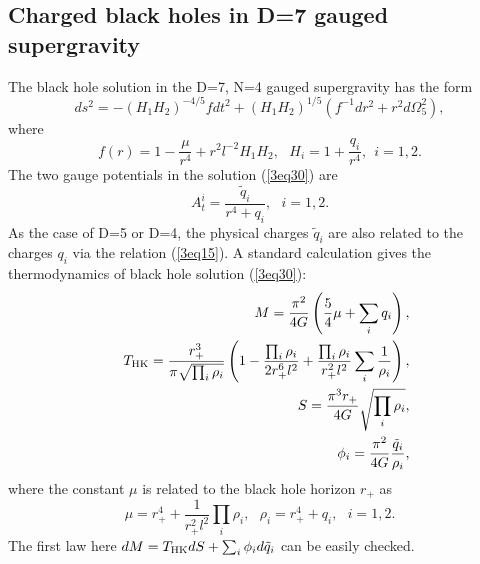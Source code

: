 \documentclass[a4paper,12pt]{article}
\begin{document}
\subsection{Charged black holes in D=7 gauged supergravity}

The black hole solution in the D=7, N=4 gauged supergravity has the
form \cite{Liu,Cvetic}
\begin{equation}
\label{3eq30}
ds^2 = -(H_1H_2)^{-4/5} fdt^2 +(H_1H_2)^{1/5}(f^{-1}dr^2 +r^2d\Omega_5^2),
\end{equation}
where
\begin{equation}
f(r)= 1-\frac{\mu}{r^4} +r^2l^{-2}H_1 H_2, \ \ \  H_i =1+\frac{q_i}{r^4},
 \ \  i=1, 2. 
\end{equation}
The two gauge potentials in the solution (\ref{3eq30}) are
\begin{equation}
A^i_t = \frac{\tilde q_i}{r^4+q_i},  \ \ \ i=1, 2.
\end{equation}
As the case of D=5 or D=4, the physical charges $\tilde q_i $ are also 
related to
the charges $q_i$ via the relation (\ref{3eq15}). A standard calculation 
gives the thermodynamics of black hole solution (\ref{3eq30}):
\begin{eqnarray}
&& M = \frac{\pi^2}{4G}\left (\frac{5}{4}\mu +\sum_i q_i\right), \nonumber \\
&& T_{\rm HK}= \frac{r_+^3}{\pi \sqrt{\prod_i \rho_i}}
  \left (1-\frac{\prod_i \rho_i}{2r_+^6 l^2} +\frac{\prod_i \rho_i}{r_+^2 l^2}
   \sum_i \frac{1}{\rho_i}\right ), \nonumber \\
&& S= \frac{\pi^3 r_+}{4G} \sqrt{\prod_i \rho_i}, \nonumber \\
&& \phi_i = \frac{\pi^2}{4G}\frac{\tilde q_i}{\rho_i},
\end{eqnarray}
where the constant $\mu$ is related to the black hole horizon $r_+$ as
\begin{equation}
\mu = r_+^4 +\frac{1}{r_+^2 l^2}\prod_i \rho_i,
 \ \ \ \rho_i = r_+^4 +q_i, \ \ \  i=1, 2.
\end{equation}
The first law  here $dM = T_{\rm HK}dS +\sum_i \phi_i d\tilde q_i$ can be 
easily checked.    
\end{document}
